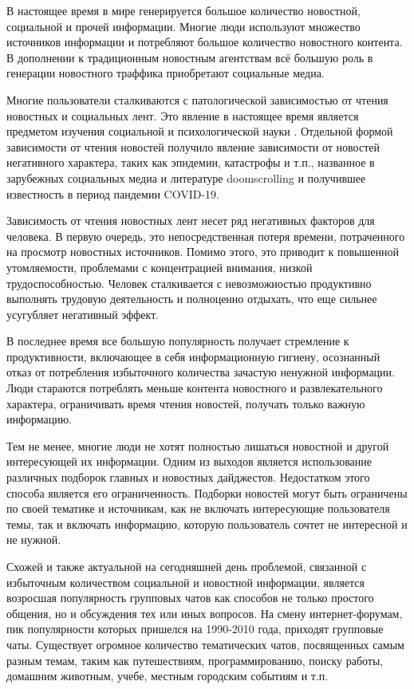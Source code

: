 \aftertitle

В настоящее время в мире генерируется большое количество новостной, социальной и прочей информации. Многие люди используют множество источников информации и потребляют большое количество новостного контента. В дополнении к традиционным новостным агентствам всё большую роль в генерации новостного траффика приобретают социальные медиа.

Многие пользователи сталкиваются с патологической зависимостью от чтения новостных и социальных лент. Это явление в настоящее время является предметом изучения социальной и психологической науки \cite{news_addiction}. Отдельной формой зависимости от чтения новостей получило явление зависимости от новостей негативного характера, таких как эпидемии, катастрофы и т.п., названное в зарубежных социальных медиа и литературе doomscrolling \cite{doomscrolling} и получившее известность в период пандемии COVID-19.

Зависимость от чтения новостных лент несет ряд негативных факторов для человека. В первую очередь, это непосредственная потеря времени, потраченного на просмотр новостных источников. Помимо этого, это приводит к повышенной утомляемости, проблемами с концентрацией внимания, низкой трудоспособностью. Человек сталкивается с невозможностью продуктивно выполнять трудовую деятельность и полноценно отдыхать, что еще сильнее усугубляет негативный эффект.

В последнее время все большую популярность получает стремление к продуктивности, включающее в себя информационную гигиену, осознанный отказ от потребления избыточного количества зачастую ненужной информации. Люди стараются потреблять меньше контента новостного и развлекательного характера, ограничивать время чтения новостей, получать только важную информацию.

Тем не менее, многие люди не хотят полностью лишаться новостной и другой интересующей их информации. Одним из выходов является использование различных подборок главных и новостных дайджестов. Недостатком этого способа является его ограниченность. Подборки новостей могут быть ограничены по своей тематике и источникам, как не включать интересующие пользователя темы, так и включать информацию, которую пользователь сочтет не интересной и не нужной.

Схожей и также актуальной на сегодняшней день проблемой, связанной с избыточным количеством социальной и новостной информации, является возросшая популярность групповых чатов как способов не только простого общения, но и обсуждения тех или иных вопросов. На смену интернет-форумам, пик популярности которых пришелся на 1990-2010 года, приходят групповые чаты. Существует огромное количество тематических чатов, посвященных самым разным темам, таким как путешествиям, программированию, поиску работы, домашним животным, учебе, местным городским событиям и т.п.

